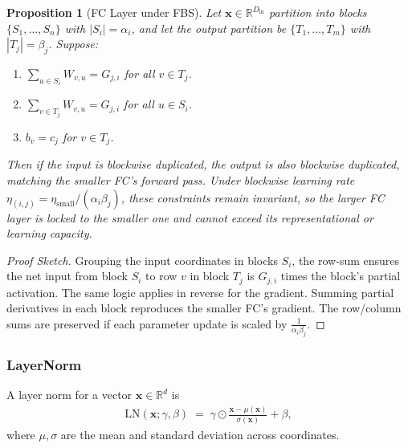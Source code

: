 \documentclass[11pt]{article}
\newtheorem{proposition}{Proposition}[section]
\begin{document}
\begin{proposition}[FC Layer under FBS]
\label{prop:FC_FBS}
Let $\mathbf{x}\in \mathbb{R}^{D_{\text{in}}}$ partition into blocks $\{S_1,\dots,S_n\}$ with $|S_i|=\alpha_i$, and let the output partition be $\{T_1,\dots,T_m\}$ with $|T_j|=\beta_j$. Suppose:
\begin{enumerate}
    \item $\sum_{u\in S_i}W_{v,u} = G_{j,i}$ for all $v\in T_j$.
    \item $\sum_{v\in T_j}W_{v,u} = G_{j,i}$ for all $u\in S_i$.
    \item $b_v = c_j$ for $v\in T_j$.
\end{enumerate}
Then if the input is blockwise duplicated, the output is also blockwise duplicated, matching the smaller FC's forward pass. Under blockwise learning rate $\eta_{(i,j)}=\eta_{\text{small}}/(\alpha_i\beta_j)$, these constraints remain invariant, so the larger FC layer is locked to the smaller one and cannot exceed its representational or learning capacity.
\end{proposition}

\begin{proof}[Proof Sketch]
Grouping the input coordinates in blocks $S_i$, the row-sum ensures the net input from block $S_i$ to row $v$ in block $T_j$ is $G_{j,i}$ times the block's partial activation. The same logic applies in reverse for the gradient. Summing partial derivatives in each block reproduces the smaller FC's gradient. The row/column sums are preserved if each parameter update is scaled by $\frac{1}{\alpha_i\beta_j}$.
\end{proof}

\subsubsection{LayerNorm}
A layer norm for a vector $\mathbf{x}\in\mathbb{R}^d$ is
\begin{align*}
  \mathrm{LN}(\mathbf{x};\gamma,\beta)
  \;=\;
  \gamma\odot \frac{\mathbf{x}-\mu(\mathbf{x})}{\sigma(\mathbf{x})} + \beta,
\end{align*}
where $\mu,\sigma$ are the mean and standard deviation across coordinates.
\end{document}
